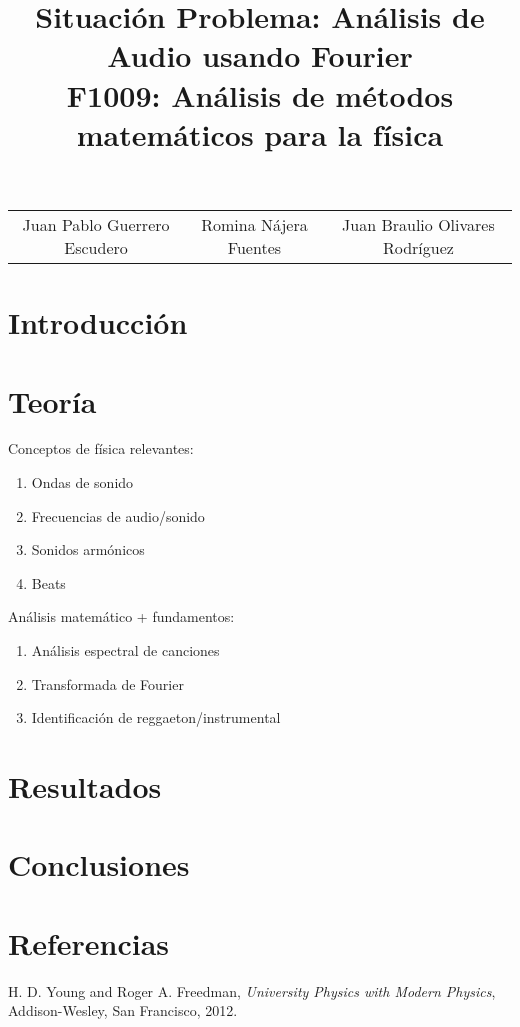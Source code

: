 \documentclass[12pt, letterpaper]{article}
\title{%
  Situación Problema: Análisis de Audio usando Fourier \\
  \large F1009: Análisis de métodos matemáticos para la física}
\begin{document}
\maketitle

\begin{tabular}{ccc}
Juan Pablo Guerrero Escudero & Romina Nájera Fuentes & Juan Braulio Olivares Rodríguez
\end{tabular}

\section*{Introducción}

\section*{Teoría}

Conceptos de física relevantes:
\begin{enumerate}
    \item Ondas de sonido
    \item Frecuencias de audio/sonido
    \item Sonidos armónicos
    \item Beats
\end{enumerate}

\noindent Análisis matemático + fundamentos:
\begin{enumerate}
    \item Análisis espectral de canciones
    \item Transformada de Fourier
    \item Identificación de reggaeton/instrumental
\end{enumerate}



\section*{Resultados}

\section*{Conclusiones}

\section*{Referencias}
\begin{thebibliography}{9}
  H. D. Young and Roger A. Freedman, \emph{University Physics with Modern Physics}, 
Addison-Wesley, San Francisco, 2012. %
  
  \end{thebibliography}
\end{document}
